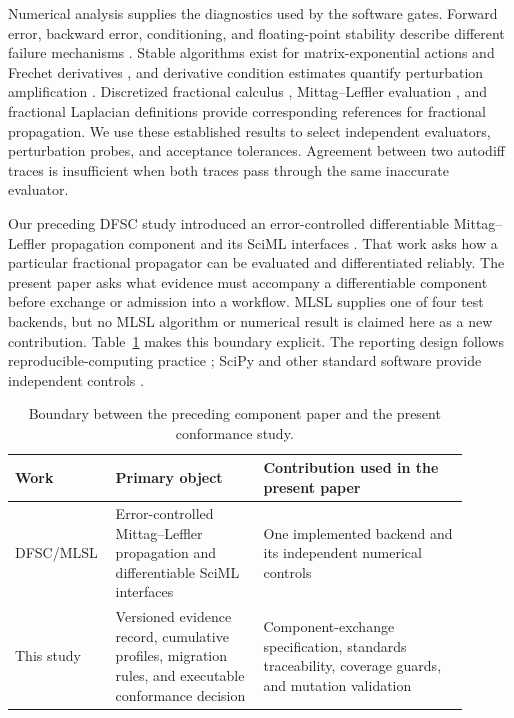\documentclass[preprint,12pt]{elsarticle}
\begin{document}
Numerical analysis supplies the diagnostics used by the software gates. Forward error, backward error, conditioning, and floating-point stability describe different failure mechanisms \citep{higham2002accuracy}. Stable algorithms exist for matrix-exponential actions and Frechet derivatives \citep{almohy2011action,almohy2009frechet}, and derivative condition estimates quantify perturbation amplification \citep{higham2008functions,higham2014frechet}. Discretized fractional calculus \citep{lubich1986discretized}, Mittag--Leffler evaluation \citep{garrappa2015mittag,gorenflo2014mittag}, and fractional Laplacian definitions \citep{lischke2020fractional} provide corresponding references for fractional propagation. We use these established results to select independent evaluators, perturbation probes, and acceptance tolerances. Agreement between two autodiff traces is insufficient when both traces pass through the same inaccurate evaluator.

Our preceding DFSC study introduced an error-controlled differentiable Mittag--Leffler propagation component and its SciML interfaces \citep{hu2026dfsc}. That work asks how a particular fractional propagator can be evaluated and differentiated reliably. The present paper asks what evidence must accompany a differentiable component before exchange or admission into a workflow. MLSL supplies one of four test backends, but no MLSL algorithm or numerical result is claimed here as a new contribution. Table~\ref{tab:p1-p4-boundary} makes this boundary explicit. The reporting design follows reproducible-computing practice \citep{wilson2017goodenough}; SciPy and other standard software provide independent controls \citep{virtanen2020scipy}.

\begin{table}[t]
\centering
\small
\caption{Boundary between the preceding component paper and the present conformance study.}
\label{tab:p1-p4-boundary}
\begin{tabular}{p{0.16\linewidth}p{0.31\linewidth}p{0.43\linewidth}}
\toprule
Work & Primary object & Contribution used in the present paper\\
\midrule
DFSC/MLSL \citep{hu2026dfsc} & Error-controlled Mittag--Leffler propagation and differentiable SciML interfaces & One implemented backend and its independent numerical controls\\
This study & Versioned evidence record, cumulative profiles, migration rules, and executable conformance decision & Component-exchange specification, standards traceability, coverage guards, and mutation validation\\
\bottomrule
\end{tabular}
\end{table}
\end{document}
